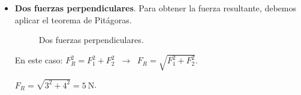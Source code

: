 \begin{itemize}
\begin{figure}[H]
        \caption{Dos fuerzas con sentido opuesto.}
    \end{figure}
    En este caso, tenemos:
    \( \Sigma F_R = F_1 + F_2 = \qty{3}{\newton} - \qty{2}{\newton} = \qty{1}{\newton} \).
    Como \( F_2 \) va en dirección contraria, le asignamos el signo negativo.

    \item \textbf{Dos fuerzas perpendiculares}.
    Para obtener la fuerza resultante, debemos aplicar el teorema de Pitágoras.
    \begin{figure}[H]
        \centering
        \caption{Dos fuerzas perpendiculares.}
        \label{fig:two_perpendicular_forces}
    \end{figure}
    En este caso:
    \( F_R^2 = F_1^2 + F_2^2 \;\;\longrightarrow\;\; F_R = \sqrt{F_1^2 + F_2^2} \).

    \( F_R = \sqrt{3^2 + 4^2} = \qty{5}{\newton} \).
\end{itemize}


